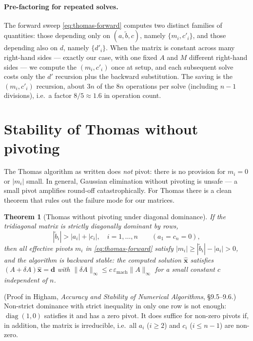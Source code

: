 \documentclass[11pt,a4paper]{article}
\newtheorem{theorem}[proposition]{Theorem}
\begin{document}
\paragraph{Pre-factoring for repeated solves.} The forward sweep
\eqref{eq:thomas-forward} computes two distinct families of
quantities: those depending only on $(a, \tilde b, c)$, namely
$\{m_i, c'_i\}$, and those depending also on $d$, namely
$\{d'_i\}$. When the matrix is constant across many right-hand
sides — exactly our case, with one fixed $A$ and $M$ different
right-hand sides — we compute the $(m_i, c'_i)$ once at setup, and
each subsequent solve costs only the $d'$ recursion plus the
backward substitution. The saving is the $(m_i, c'_i)$ recursion,
about $3n$ of the $8n$ operations per solve (including $n-1$
divisions), i.e.\ a factor $8/5 \approx 1.6$ in operation count.

\section{Stability of Thomas without pivoting}\label{sec:thomas-stab}

The Thomas algorithm as written does \emph{not} pivot: there is no
provision for $m_i = 0$ or $|m_i|$ small. In general, Gaussian
elimination without pivoting is unsafe — a small pivot amplifies
round-off catastrophically. For Thomas there is a clean theorem
that rules out the failure mode for our matrices.

\begin{theorem}[Thomas without pivoting under diagonal dominance]
\label{thm:thomas-stab}
If the tridiagonal matrix is strictly diagonally dominant by rows,
\begin{equation}
|\tilde b_i| > |a_i| + |c_i|, \quad i = 1, \dots, n
\qquad (a_1 = c_n = 0),
\label{eq:diag-dominance}
\end{equation}
then all effective
pivots $m_i$ in \eqref{eq:thomas-forward} satisfy $|m_i| \ge
|\tilde b_i| - |a_i| > 0$, and the algorithm is backward stable:
the computed solution $\hat{\mathbf{x}}$ satisfies
$(A + \delta A)\hat{\mathbf{x}} = \mathbf{d}$ with
$\|\delta A\|_\infty \le c\,\varepsilon_{\mathrm{mach}}\|A\|_\infty$
for a small constant $c$ independent of $n$.
\end{theorem}

(Proof in Higham, \emph{Accuracy and Stability of Numerical Algorithms},
\S9.5--9.6.) Non-strict dominance with strict inequality in only one
row is not enough: $\operatorname{diag}(1, 0)$ satisfies it and has a
zero pivot. It does suffice for non-zero pivots if, in addition, the
matrix is irreducible, i.e.\ all $a_i$ ($i \ge 2$) and $c_i$
($i \le n-1$) are non-zero.
\end{document}
